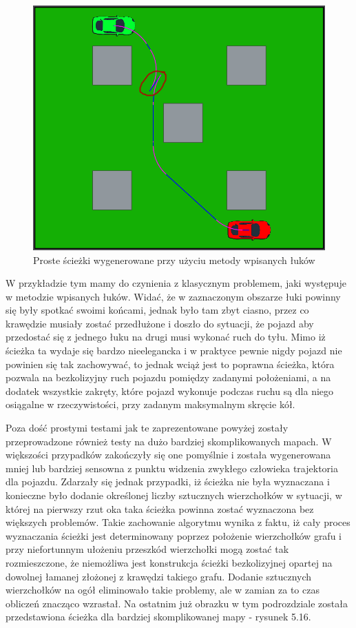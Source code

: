 \documentclass[a4paper,11pt,twoside]{report}
\theoremstyle{definition}
\begin{document}
\begin{figure}[h!]
\centering
\includegraphics[scale=0.6]{simplePath3}
\caption[Proste ścieżki wygenerowane przy użyciu metody wpisanych łuków]{Proste ścieżki wygenerowane przy użyciu metody wpisanych łuków}
\end{figure}

W przykładzie tym mamy do czynienia z klasycznym problemem, jaki występuje w metodzie wpisanych łuków. Widać, że w zaznaczonym obszarze łuki powinny się były spotkać swoimi końcami, jednak było tam zbyt ciasno, przez co krawędzie musiały zostać przedłużone i doszło do sytuacji, że pojazd aby przedostać się z jednego łuku na drugi musi wykonać ruch do tyłu. Mimo iż ścieżka ta wydaje się bardzo nieelegancka i w praktyce pewnie nigdy pojazd nie powinien się tak zachowywać, to jednak wciąż jest to poprawna ścieżka, która pozwala na bezkolizyjny ruch pojazdu pomiędzy zadanymi położeniami, a na dodatek wszystkie zakręty, które pojazd wykonuje podczas ruchu są dla niego osiągalne w rzeczywistości, przy zadanym maksymalnym skręcie kół.

Poza dość prostymi testami jak te zaprezentowane powyżej zostały przeprowadzone również testy na dużo bardziej skomplikowanych mapach. W większości przypadków zakończyły się one pomyślnie i została wygenerowana mniej lub bardziej sensowna z punktu widzenia zwykłego człowieka trajektoria dla pojazdu. Zdarzały się jednak przypadki, iż ścieżka nie była wyznaczana i konieczne było dodanie określonej liczby sztucznych wierzchołków w sytuacji, w której na pierwszy rzut oka taka ścieżka powinna zostać wyznaczona bez większych problemów. Takie zachowanie algorytmu wynika z faktu, iż cały proces wyznaczania ścieżki jest determinowany poprzez położenie wierzchołków grafu i przy niefortunnym ułożeniu przeszkód wierzchołki mogą zostać tak rozmieszczone, że niemożliwa jest konstrukcja ścieżki bezkolizyjnej opartej na dowolnej łamanej złożonej z krawędzi takiego grafu. Dodanie sztucznych wierzchołków na ogół eliminowało takie problemy, ale w zamian za to czas obliczeń znacząco wzrastał. Na ostatnim już obrazku w tym podrozdziale została przedstawiona ścieżka dla bardziej skomplikowanej mapy - rysunek 5.16.
\end{document}
